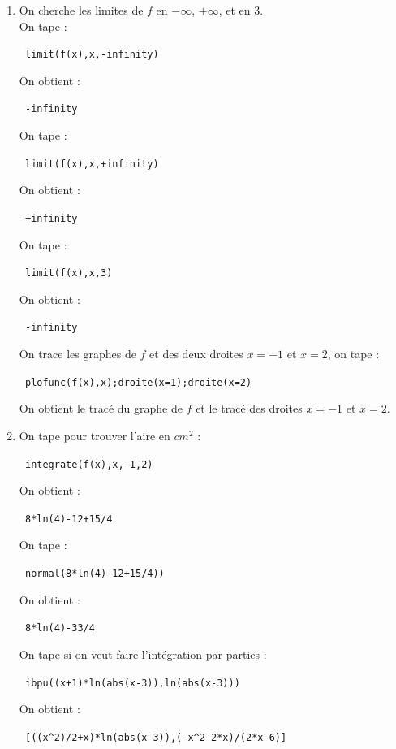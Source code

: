 \documentclass{article}
\begin{document}
\begin{enumerate}
Donc  $f'(x)>0$ si $x \in\ ]-\infty;\alpha[\  \cup \ ]3;+\infty[\ $ 
et $f'(x)<0$ si $x \in\ ]\alpha;3[$.\\
Donc $f$ est croissante sur $\ ]-\infty;\alpha[\   \cup \ ]3;+\infty[\ $ et 
est d\'ecroissante sur $\ ]\alpha;3[$.
\item 
On cherche les limites de $f$ en $-\infty$, $+\infty$, et en $3$.\\
On tape :
\begin{center}
\verb| limit(f(x),x,-infinity)|
\end{center}
On obtient :
\begin{center}
\verb| -infinity|
\end{center}
On tape :
\begin{center}
\verb| limit(f(x),x,+infinity)|
\end{center}
On obtient :
\begin{center}
\verb| +infinity|
\end{center}
On tape :
\begin{center}
\verb| limit(f(x),x,3)|
\end{center}
On obtient :
\begin{center}
\verb| -infinity|
\end{center}
On trace les graphes de $f$ et des deux droites $x=-1$ et $ x=2$, on tape :
\begin{center}
\verb| plofunc(f(x),x);droite(x=1);droite(x=2)|
\end{center}
On obtient le trac\'e du graphe de $f$ et le trac\'e des droites
$x=-1$ et $x=2$.
\item 
On tape pour trouver l'aire en $cm^2$ :
\begin{center}
\verb| integrate(f(x),x,-1,2)|
\end{center}
On obtient :
\begin{center}
\verb| 8*ln(4)-12+15/4|
\end{center}
On tape :
\begin{center}
\verb| normal(8*ln(4)-12+15/4))|
\end{center}
On obtient :
\begin{center}
\verb| 8*ln(4)-33/4|
\end{center}
On tape si on veut faire l'int\'egration par parties :
\begin{center}
\verb| ibpu((x+1)*ln(abs(x-3)),ln(abs(x-3)))|
\end{center}
On obtient :
\begin{center}
\verb| [((x^2)/2+x)*ln(abs(x-3)),(-x^2-2*x)/(2*x-6)]|
\end{center}

\end{enumerate}
\end{document}
